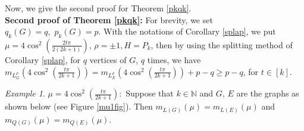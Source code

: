 \documentclass{amsart}
\theoremstyle{remark}
\newtheorem{example}[theorem]{Example}
\begin{document}
Now, we give the second proof for Theorem \ref{pkqk}.\\

{\noindent \textbf{Second proof of Theorem \ref{pkqk}:} For brevity, we set $q_{k}(G)=q,\,\, p_{k}(G)=p$. With the notations of Corollary \ref{splap}, we put $\mu=4\cos^{2}(\frac{2t\pi}{2(2k+1)})$, $\rho=\pm 1, H=P_{k}$, then by using the splitting method of Corollary \ref{splap}, for $q$ vertices of $G$, $q$ times, we have  $m_{L_{G}^{\rho}}(4\cos^{2}(\frac{t\pi}{2k+1}))=m_{L_{E}^{\rho}}(4\cos^{2}(\frac{t\pi}{2k+1}))+p-q\geq p-q$, for $t\in [k]$.}\\

\begin{example}\label{mu1}\textbf{$\mu=4\cos^{2}(\frac{t\pi}{2k+1}):$}
Suppose that $k\in\mathbb{N}$ and $G,\,E$ are the  graphs as shown below (see Figure \ref{mu1fig}). Then $m_{L(G)}(\mu)=m_{L(E)}(\mu)$ and $m_{Q(G)}(\mu)=m_{Q(E)}(\mu)$.
\end{example}
\end{document}
